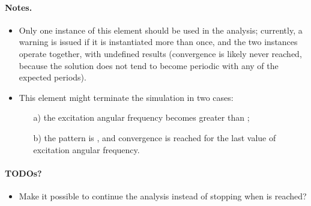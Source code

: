 \paragraph{Notes.}
\begin{itemize}
\item Only one instance of this element should be used in the analysis; currently, a warning is issued if it is instantiated more than once, and the two instances operate together, with undefined results (convergence is likely never reached, because the solution does not tend to become periodic with any of the expected periods).

\item This element might terminate the simulation in two cases:
\begin{itemize}
\item[a)] the excitation angular frequency becomes greater than ;
\item[b)] the  pattern is , and convergence is reached for the last value of excitation angular frequency.
\end{itemize}
\end{itemize}

\paragraph{TODOs?}
\begin{itemize}
\item Make it possible to continue the analysis instead of stopping when  is reached?
\end{itemize}
